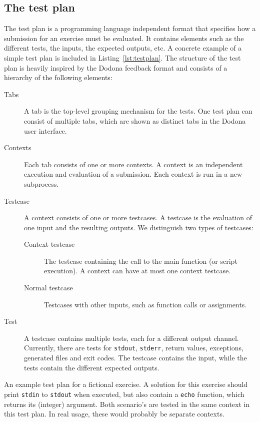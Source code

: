 \documentclass[5p,number]{elsarticle}
\begin{document}
    \subsection{The test plan}\label{subsec:the-test-plan}

    The test plan is a programming language independent format that specifies how a submission for an exercise must be evaluated.
    It contains elements such as the different tests, the inputs, the expected outputs, etc.
    A concrete example of a simple test plan is included in Listing~\ref{lst:testplan}.
    The structure of the test plan is heavily inspired by the Dodona  feedback format and consists of a hierarchy of the following elements:

    \begin{description}
        \item[Tabs] A tab is the top-level grouping mechanism for the tests.
        One test plan can consist of multiple tabs, which are shown as distinct tabs in the Dodona user interface.
        \item[Contexts] Each tab consists of one or more contexts.
        A context is an independent execution and evaluation of a submission.
        Each context is run in a new subprocess.
        \item[Testcase] A context consists of one or more testcases.
        A testcase is the evaluation of one input and the resulting outputs.
        We distinguish two types of testcases:
        \begin{description}
            \item[Context testcase] The testcase containing the call to the main function (or script execution).
            A context can have at most one context testcase.
            \item[Normal testcase] Testcases with other inputs, such as function calls or assignments.
        \end{description}
        \item[Test] A testcase contains multiple tests, each for a different output channel.
        Currently, there are tests for \texttt{stdout}, \texttt{stderr}, return values, exceptions, generated files and exit codes.
        The testcase contains the input, while the tests contain the different expected outputs.
    \end{description}

    \begin{listing}
        \caption{
        An example test plan for a fictional exercise.
        A solution for this exercise should print \texttt{stdin} to \texttt{stdout} when executed, but also contain a \texttt{echo} function, which returns its (integer) argument.
        Both scenario's are tested in the same context in this test plan.
        In real usage, these would probably be separate contexts.
        }
        \inputminted[fontsize=\small]{json}{code/extended-plan.tson}
        \label{lst:testplan}
    \end{listing}
\end{document}

